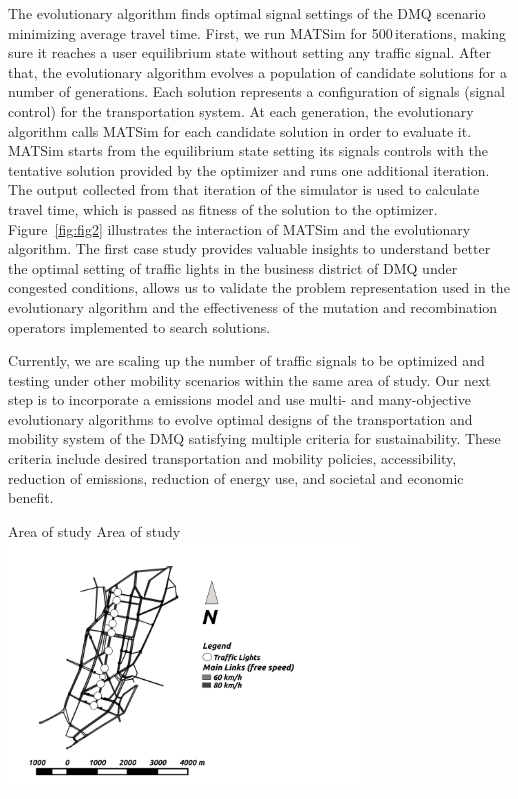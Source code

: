 The evolutionary algorithm finds optimal signal settings of the DMQ scenario minimizing average travel time. First, we run MATSim for 500\,iterations, making sure it reaches a user equilibrium state without setting any traffic signal. After that, the evolutionary algorithm evolves a population of candidate solutions for a number of generations. Each solution represents a configuration of signals (signal control) for the transportation system. At each generation, the evolutionary algorithm calls MATSim for each candidate solution in order to evaluate it. MATSim starts from the equilibrium state setting its signals controls with the tentative solution provided by the optimizer and runs one additional iteration. The output collected from that iteration of the simulator is used to calculate travel time, which is passed as fitness of the solution to the optimizer. Figure~\ref{fig:fig2} illustrates the interaction of MATSim and the evolutionary algorithm. The first case study \citep[][]{ArmasEtAl_SEAL_2014} provides valuable insights to understand better the optimal setting of traffic lights in the business district of DMQ under congested conditions, allows us to validate the problem representation used in the evolutionary algorithm and the effectiveness of the mutation and recombination operators implemented to search solutions.

Currently, we are scaling up the number of traffic signals to be optimized and testing under other mobility scenarios within the same area of study. Our next step is to incorporate a emissions model and use multi- and many-objective evolutionary algorithms \citep[][]{AguireEtAl_EMO_2013} to evolve optimal designs of the transportation and mobility system of the DMQ satisfying multiple criteria for sustainability. These criteria include desired transportation and mobility policies, accessibility, reduction of emissions, reduction of energy use, and societal and economic benefit.

\createfigure%
{Area of study}%
{Area of study}%
{\label{fig:fig1}}%
{\includegraphics[width=0.7\textwidth, angle=0]{./using/figures/qfig1.png}}%
{}

